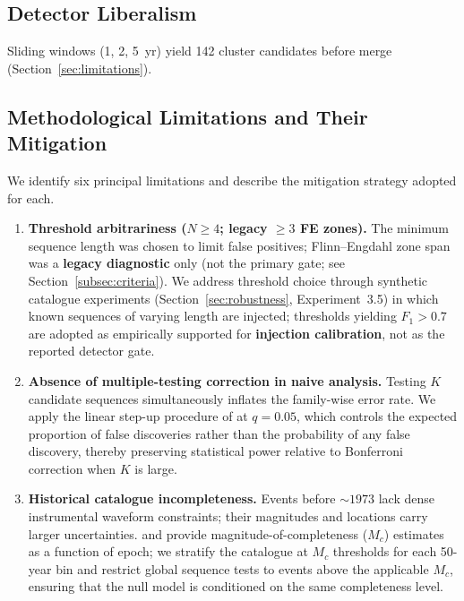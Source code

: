 \documentclass[draft]{agujournal2019}
\begin{document}
\subsection{Detector Liberalism}
\label{sec:detector-liberal}

Sliding windows (1, 2, 5~yr) yield 142 cluster candidates before merge
(Section~\ref{sec:limitations}).

\subsection{Methodological Limitations and Their Mitigation}
\label{subsec:limitations-mitigation}

We identify six principal limitations and describe the mitigation strategy
adopted for each.

\begin{enumerate}

\item \textbf{Threshold arbitrariness ($N \geq 4$; legacy $\geq 3$ FE zones).}
The minimum sequence length was chosen to limit false positives; Flinn--Engdahl
zone span was a \textbf{legacy diagnostic} only (not the primary gate; see
Section~\ref{subsec:criteria}).  We address threshold choice through synthetic
catalogue experiments (Section~\ref{sec:robustness},
Experiment~3.5) in which known sequences of varying length are injected;
thresholds yielding $F_1 > 0.7$ are adopted as empirically supported for
\textbf{injection calibration}, not as the reported detector gate.

\item \textbf{Absence of multiple-testing correction in naive analysis.}
Testing $K$ candidate sequences simultaneously inflates the family-wise
error rate.  We apply the linear step-up procedure of
\citet{BenjaminiHochberg1995} at $q = 0.05$, which controls the expected
proportion of false discoveries rather than the probability of any false
discovery, thereby preserving statistical power relative to Bonferroni
correction when $K$ is large.

\item \textbf{Historical catalogue incompleteness.}
Events before $\sim\!1973$ lack dense instrumental waveform constraints;
their magnitudes and locations carry larger uncertainties.
\citet{Wiemer2000} and \citet{Woessner2005} provide magnitude-of-completeness
($M_c$) estimates as a function of epoch; we stratify the catalogue at
$M_c$ thresholds for each 50-year bin and restrict global sequence tests
to events above the applicable $M_c$, ensuring that the null model is
conditioned on the same completeness level.


\end{enumerate}
\end{document}
